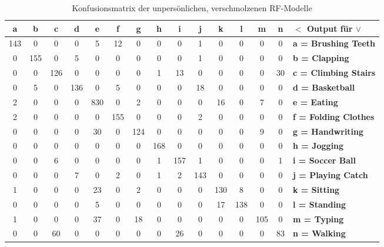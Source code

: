 \begin{table}
\centering
\begin{tabular}{|c|c|c|c|c|c|c|c|c|c|c|c|c|c||l|}
	\hline 
  \textbf{a} &   \textbf{b} &   \textbf{c} &   \textbf{d} &   \textbf{e} &   \textbf{f} &   \textbf{g} &   \textbf{h} &   \textbf{i} &   \textbf{j} &   \textbf{k} &   \textbf{l} &   \textbf{m}  &  \textbf{n} & \textbf{$<$ Output für $\vee$} \\
\hline 
\hline
143 &   0 &   0 &   0 &   5 &  12 &   0 &   0 &   0 &   1 &   0 &   0 &   0  &  0 &   \textbf{a = Brushing Teeth} \\
\hline 
0 & 155 &   0 &   5 &   0 &   0 &   0 &   0 &   0 &   1 &   0 &   0 &   0  &  0 &   \textbf{b = Clapping} \\
\hline 
0 &   0 & 126 &   0 &   0 &   0 &   0 &   1 &  13 &   0 &   0 &   0 &   0  & 30 &   \textbf{c = Climbing Stairs} \\
\hline 
0 &   5 &   0 & 136 &   0 &   5 &   0 &   0 &   0 &  18 &   0 &   0 &   0  &  0 &   \textbf{d = Basketball} \\
\hline 
2 &   0 &   0 &   0 & 830 &   0 &   2 &   0 &   0 &   0 &  16 &   0 &   7  &  0 &   \textbf{e = Eating} \\
\hline 
2 &   0 &   0 &   0 &   0 & 155 &   0 &   0 &   0 &   2 &   0 &   0 &   0  &  0 &   \textbf{f = Folding Clothes} \\
\hline 
0 &   0 &   0 &   0 &  30 &   0 & 124 &   0 &   0 &   0 &   0 &   0 &   9  &  0 &   \textbf{g = Handwriting} \\
\hline 
0 &   0 &   0 &   0 &   0 &   0 &   0 & 168 &   0 &   0 &   0 &   0 &   0  &  0 &   \textbf{h = Jogging} \\
\hline 
0 &   0 &   6 &   0 &   0 &   0 &   0 &   1 & 157 &   1 &   0 &   0 &   0  &  1 &   \textbf{i = Soccer Ball} \\
\hline 
0 &   0 &   0 &   7 &   0 &   2 &   0 &   1 &   2 & 143 &   0 &   0 &   0  &  0 &   \textbf{j = Playing Catch} \\
\hline 
1 &   0 &   0 &   0 &  23 &   0 &   2 &   0 &   0 &   0 & 130 &   8 &   0  &  0 &   \textbf{k = Sitting} \\
\hline 
0 &   0 &   0 &   0 &   5 &   0 &   0 &   0 &   0 &   0 &  17 & 138 &   0  &  0 &   \textbf{l = Standing} \\
\hline 
1 &   0 &   0 &   0 &  37 &   0 &  18 &   0 &   0 &   0 &   0 &   0 & 105  &  0 &   \textbf{m = Typing} \\
\hline 
0 &   0 &  60 &   0 &   0 &   0 &   0 &   0 &  26 &   0 &   0 &   0 &   0  & 83 &   \textbf{n = Walking} \\
	\hline 
\end{tabular}
\caption{Konfusionsmatrix der unpersönlichen, verschmolzenen RF-Modelle}
\label{tab:confusion-impersonal-rf-merged}
\end{table}

